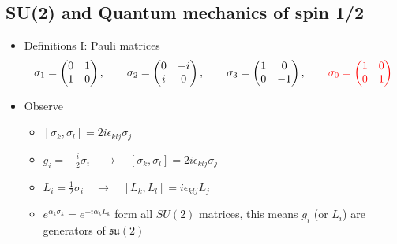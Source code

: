 \documentclass[../main.tex]{subfiles}
\begin{document}
\subsection{SU(2) and Quantum mechanics of spin 1/2}
\begin{itemize}
\item Definitions I: Pauli matrices
\begin{align}
\sigma_1=\left(\begin{matrix}
0 & 1\\
1 & 0
\end{matrix}
\right),\qquad
\sigma_2=\left(\begin{matrix}
0 & -i\\
i & 0
\end{matrix}
\right),\qquad
\sigma_3=\left(\begin{matrix}
1 & 0\\
0 & -1
\end{matrix}
\right),\qquad\textcolor{red}{
\sigma_0=\left(\begin{matrix}
1 & 0\\
0 & 1
\end{matrix}
\right)}
\end{align}
\item Observe
\begin{itemize}
\item $[\sigma_k,\sigma_l]=2i\epsilon_{klj}\sigma_j$
\item $g_i=-\frac{i}{2}\sigma_i\quad\rightarrow\quad[\sigma_k,\sigma_l]=2i\epsilon_{klj}\sigma_j$
\item $L_i=\frac{1}{2}\sigma_i\quad\rightarrow\quad[L_k,L_l]=i\epsilon_{klj}L_j$
\item $e^{\alpha_k\sigma_k}=e^{-i\alpha_kL_k}$ form all $SU(2)$ matrices, this means $g_i$ (or $L_i$) are generators of $\mathfrak{su}(2)$ 
\end{itemize}


\end{itemize}
\end{document}
